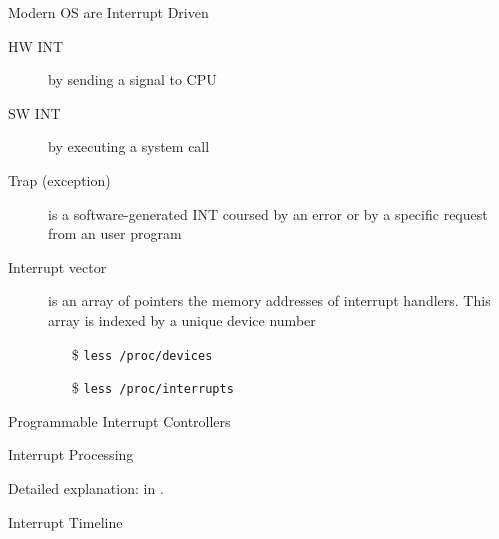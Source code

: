 \begin{frame}{Modern OS are Interrupt Driven}
  \begin{description}
  \item[HW INT] by sending a signal to CPU
  \item[SW INT] by executing a \alert{system call}
  \item[Trap (exception)] is a software-generated INT coursed by an error or by a
    specific request from an user program
  \item[Interrupt vector] is an array of pointers {\pright} the memory addresses
    of \alert{interrupt handlers}. This array is indexed by a unique device number
    \begin{itemize}
    \item[\$] \texttt{less /proc/devices}
    \item[\$] \texttt{less /proc/interrupts}
    \end{itemize}
  \end{description}
\end{frame}

\begin{frame}{Programmable Interrupt Controllers}
  \begin{center}
  \end{center}
\end{frame}

\begin{frame}{Interrupt Processing}
  \begin{center}
  \end{center}
\end{frame}

Detailed explanation: in .

\begin{frame}{Interrupt Timeline}
  \begin{center}
  \end{center}
\end{frame}

